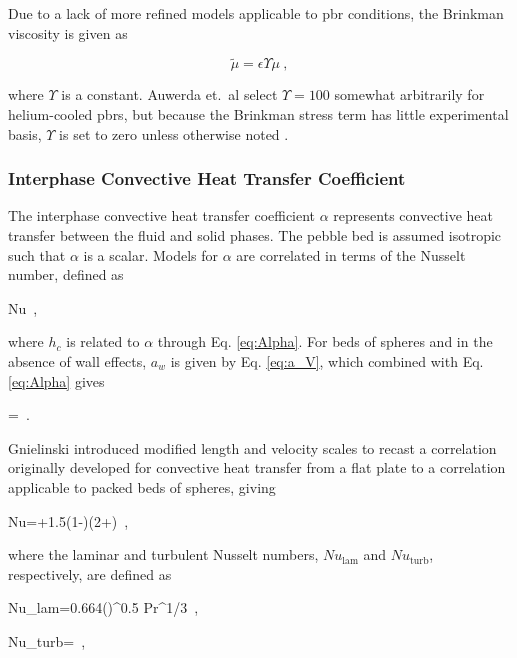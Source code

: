 Due to a lack of more refined models applicable to \gls{pbr} conditions, the Brinkman viscosity is given as

\begin{equation}
\label{eq:MultiplierEffectiveViscosity}
\tilde{\mu}=\epsilon\Upsilon\mu\ ,
\end{equation}

\noindent where \(\Upsilon\) is a constant. Auwerda et.\ al select \(\Upsilon=100\) somewhat arbitrarily for helium-cooled \glspl{pbr}, but because the Brinkman stress term has little experimental basis, \(\Upsilon\) is set to zero unless otherwise noted \cite{auwerda_2011}.

\subsubsection{Interphase Convective Heat Transfer Coefficient}
\label{sec:alpha}

The interphase convective heat transfer coefficient \(\alpha\) represents convective heat transfer between the fluid and solid phases. The pebble bed is assumed isotropic such that \(\alpha\) is a scalar. Models for \(\alpha\) are correlated in terms of the Nusselt number, defined as

\beq
\label{eq:NuDef}
Nu\equiv{}\ ,
\eeq

\noindent where \(h_c\) is related to \(\alpha\) through Eq. \eqref{eq:Alpha}. For beds of spheres and in the absence of wall effects, \(a_w\) is given by Eq. \eqref{eq:a_V}, which combined with Eq. \eqref{eq:Alpha} gives

\beq
\alpha=\ .
\eeq

\noindent Gnielinski introduced modified length and velocity scales to recast a correlation originally developed for convective heat transfer from a flat plate to a correlation applicable to packed beds of spheres, giving

\beq
\label{eq:GnielinskiPebblebed}
Nu=\left{}+1.5(1-\epsilon)\right\rbrack\left(2+\right)\ ,
\eeq

\noindent where the laminar and turbulent Nusselt numbers, \(Nu_\text{lam}\) and \(Nu_\text{turb}\), respectively, are defined as

\beq
\label{eq:NuLam}
Nu_{\textrm{lam}}=0.664\left(\right)^{0.5} Pr^{1/3}\ ,
\eeq

\beq
\label{eq:NuTurb}
Nu_{\textrm{turb}}=\ ,
\eeq

